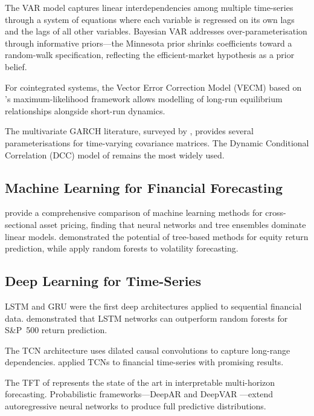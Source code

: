 \documentclass[11pt,a4paper,twocolumn]{article}
\begin{document}
The VAR model \citep{sims1980,lutkepohl2005} captures linear interdependencies
among multiple time-series through a system of equations where each variable is
regressed on its own lags and the lags of all other variables.  Bayesian VAR
\citep{doan1984} addresses over-parameterisation through informative
priors---the Minnesota prior shrinks coefficients toward a random-walk
specification, reflecting the efficient-market hypothesis as a prior belief.

For cointegrated systems, the Vector Error Correction Model (VECM) based on
\citeauthor{johansen1991}'s \citeyearpar{johansen1991} maximum-likelihood
framework allows modelling of long-run equilibrium relationships alongside
short-run dynamics.

The multivariate GARCH literature, surveyed by \citet{bauwens2006}, provides
several parameterisations for time-varying covariance matrices.  The Dynamic
Conditional Correlation (DCC) model of \citet{engle2002} remains the most
widely used.

\subsection{Machine Learning for Financial Forecasting}

\citet{gu2020} provide a comprehensive comparison of machine learning methods
for cross-sectional asset pricing, finding that neural networks and tree
ensembles dominate linear models.  \citet{leung2000} demonstrated the potential
of tree-based methods for equity return prediction, while \citet{babiak2020}
apply random forests to volatility forecasting.

\subsection{Deep Learning for Time-Series}

LSTM \citep{hochreiter1997} and GRU \citep{cho2014} were the first deep
architectures applied to sequential financial data.  \citet{fischer2018}
demonstrated that LSTM networks can outperform random forests for S\&P~500
return prediction.

The TCN architecture \citep{bai2018} uses dilated causal convolutions to
capture long-range dependencies.  \citet{borovykh2019} applied TCNs to
financial time-series with promising results.

The TFT of \citet{lim2021} represents the state of the art in interpretable
multi-horizon forecasting.  Probabilistic frameworks---DeepAR
\citep{salinas2020} and DeepVAR \citep{salinas2019}---extend autoregressive
neural networks to produce full predictive distributions.
\end{document}
